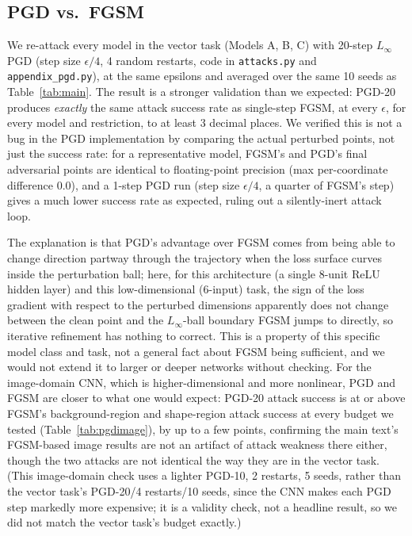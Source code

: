 \documentclass[11pt]{article}
\begin{document}
\subsection{PGD vs.\ FGSM}
\label{app:pgd}

We re-attack every model in the vector task (Models A, B, C) with 20-step
$L_\infty$ PGD (step size $\epsilon/4$, 4 random restarts, code in
\texttt{attacks.py} and \texttt{appendix\_pgd.py}), at the same epsilons
and averaged over the same 10 seeds as Table~\ref{tab:main}. The result is
a stronger validation than we expected: PGD-20 produces \emph{exactly} the
same attack success rate as single-step FGSM, at every $\epsilon$, for
every model and restriction, to at least 3 decimal places. We verified
this is not a bug in the PGD implementation by comparing the actual
perturbed points, not just the success rate: for a representative model,
FGSM's and PGD's final adversarial points are identical to floating-point
precision (max per-coordinate difference $0.0$), and a 1-step PGD run
(step size $\epsilon/4$, a quarter of FGSM's step) gives a much lower
success rate as expected, ruling out a silently-inert attack loop.

The explanation is that PGD's advantage over FGSM comes from being able to
change direction partway through the trajectory when the loss surface
curves inside the perturbation ball; here, for this architecture (a single
$8$-unit ReLU hidden layer) and this low-dimensional ($6$-input) task, the
sign of the loss gradient with respect to the perturbed dimensions
apparently does not change between the clean point and the $L_\infty$-ball
boundary FGSM jumps to directly, so iterative refinement has nothing to
correct. This is a property of this specific model class and task, not a
general fact about FGSM being sufficient, and we would not extend it to
larger or deeper networks without checking. For the image-domain CNN,
which is higher-dimensional and more nonlinear, PGD and FGSM are closer to
what one would expect: PGD-20 attack success is at or above FGSM's
background-region and shape-region attack success at every budget we
tested (Table~\ref{tab:pgdimage}), by up to a few points, confirming the
main text's FGSM-based image results are not an artifact of attack
weakness there either, though the two attacks are not identical the way
they are in the vector task. (This image-domain check uses a lighter
PGD-10, 2 restarts, 5 seeds, rather than the vector task's PGD-20/4
restarts/10 seeds, since the CNN makes each PGD step markedly more
expensive; it is a validity check, not a headline result, so we did not
match the vector task's budget exactly.)
\end{document}

